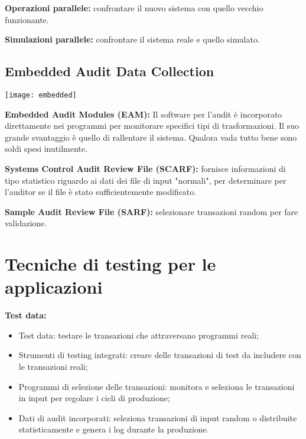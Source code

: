 \textbf{Operazioni parallele:} confrontare il nuovo sistema con quello vecchio
funzionante.

\textbf{Simulazioni parallele:} confrontare il sistema reale e quello simulato.

\subsection{Embedded Audit Data Collection}

        \begin{center}
                \texttt{[image: embedded]}
        		\label{fig:testing:embedded:audit:data:collection}
        \end{center}


\textbf{Embedded Audit Modules (EAM):} Il software per l'audit è incorporato
direttamente nei programmi per monitorare specifici tipi di trasformazioni.
Il suo grande svantaggio è quello di rallentare il sistema. Qualora vada tutto
bene sono soldi spesi inutilmente.

\textbf{Systems Control Audit Review File (SCARF):} fornisce informazioni di
tipo statistico riguardo ai dati dei file di input "normali", per determinare
per l'auditor se il file è stato sufficientemente modificato.

\textbf{Sample Audit Review File (SARF):} selezionare transazioni random per
fare validazione.

\section{Tecniche di testing per le applicazioni}

\textbf{Test data:}
\begin{itemize}
    \item Test data: testare le transazioni che attraversano programmi reali;
    \item Strumenti di testing integrati: creare delle transazioni di test da
    includere con le transazioni reali;
    \item Programmi di selezione delle transazioni: monitora e seleziona le
    transazioni in input per regolare i cicli di produzione;
    \item Dati di audit incorporati: seleziona transazioni di input random o
    distribuite statisticamente e genera i log durante la produzione.
\end{itemize}

